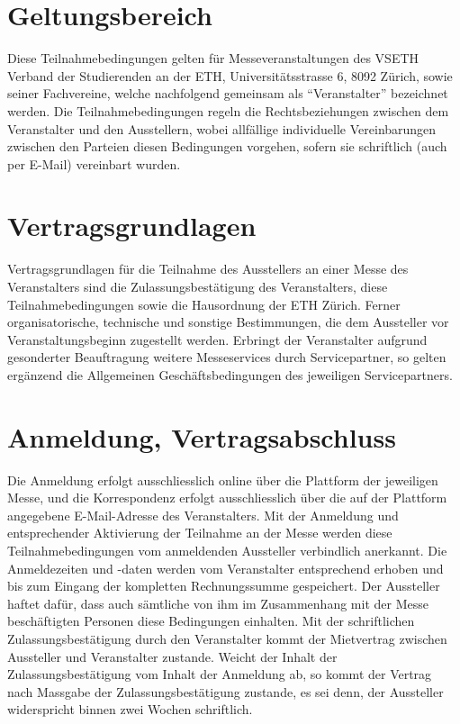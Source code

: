 \documentclass[8pt,a4paper]{article}
\begin{document}
\begin{multicols}{2}

\section{Geltungsbereich}
Diese Teilnahmebedingungen gelten für Messeveranstaltungen des VSETH Verband der Studierenden an der ETH, Universitätsstrasse 6, 8092 Zürich, sowie seiner Fachvereine, welche nachfolgend gemeinsam als ``Veranstalter'' bezeichnet werden. Die Teilnahmebedingungen regeln die Rechtsbeziehungen zwischen dem Veranstalter und den Ausstellern, wobei allfällige individuelle Vereinbarungen zwischen den Parteien diesen Bedingungen vorgehen, sofern sie schriftlich (auch per E-Mail) vereinbart wurden.

\section{Vertragsgrundlagen}
Vertragsgrundlagen für die Teilnahme des Ausstellers an einer Messe des Veranstalters sind die Zulassungsbestätigung des Veranstalters, diese Teilnahmebedingungen sowie die Hausordnung der ETH Zürich. Ferner organisatorische, technische und sonstige Bestimmungen, die dem Aussteller vor Veranstaltungsbeginn zugestellt werden. Erbringt der Veranstalter aufgrund gesonderter Beauftragung weitere Messeservices durch Servicepartner, so gelten ergänzend die Allgemeinen Geschäftsbedingungen des jeweiligen Servicepartners.

\section{Anmeldung, Vertragsabschluss}
Die Anmeldung erfolgt ausschliesslich online über die Plattform der jeweiligen Messe, und die Korrespondenz erfolgt ausschliesslich über die auf der Plattform angegebene E-Mail-Adresse des Veranstalters. Mit der Anmeldung und entsprechender Aktivierung der Teilnahme an der Messe werden diese Teilnahmebedingungen vom anmeldenden Aussteller verbindlich anerkannt. Die Anmeldezeiten und -daten werden vom Veranstalter entsprechend erhoben und bis zum Eingang der kompletten Rechnungssumme gespeichert. Der Aussteller haftet dafür, dass auch sämtliche von ihm im Zusammenhang mit der Messe beschäftigten Personen diese Bedingungen einhalten. Mit der schriftlichen Zulassungsbestätigung durch den Veranstalter kommt der Mietvertrag zwischen Aussteller und Veranstalter zustande. Weicht der Inhalt der Zulassungsbestätigung vom Inhalt der Anmeldung ab, so kommt der Vertrag nach Massgabe der Zulassungsbestätigung zustande, es sei denn, der Aussteller widerspricht binnen zwei Wochen schriftlich.


\end{multicols}
\end{document}
